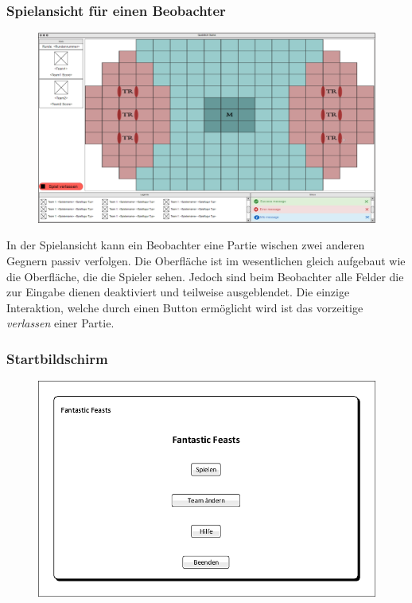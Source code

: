     \subsubsection{Spielansicht für einen Beobachter}
        
    \begin{figure}[H]
        \centering
        \includegraphics[width=\textwidth]{images/InGameObserver.PNG}
    \end{figure}

    In der Spielansicht kann ein Beobachter eine Partie wischen zwei anderen Gegnern passiv verfolgen. Die Oberfläche ist im wesentlichen gleich aufgebaut wie die Oberfläche, die die Spieler sehen. Jedoch sind beim Beobachter alle Felder die zur Eingabe dienen deaktiviert und teilweise ausgeblendet. Die einzige Interaktion, welche durch einen Button ermöglicht wird ist das vorzeitige \textit{verlassen} einer Partie.
    
    \subsubsection{Startbildschirm}
\begin{figure}[H]
	\centering
	\includegraphics[scale=0.8]{images/Startbildschirm.pdf}
\end{figure}

